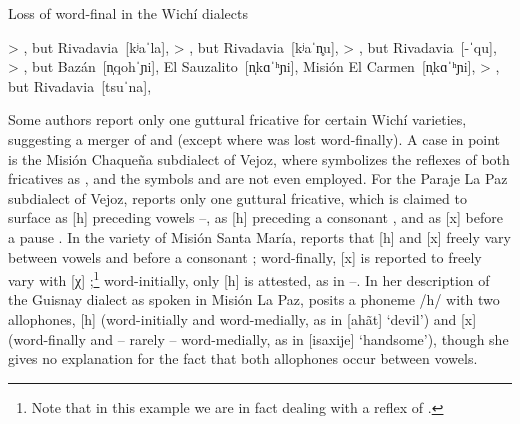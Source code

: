 \ea
Loss of word-final  in the Wichí dialects \citep{JT09-cap,JT09-th,MC09,VN14,KC16} \label{wi-h-0}\\
    \begin{xlist}
        \ex {} > , but Rivadavia~[kʲaˈla], 
        \ex {} > , but Rivadavia~[kʲaˈn̥u], 
        \ex {} > , but Rivadavia~[\mbox{-}ˈqu], 
        \ex {} > , but Bazán~[n̩qohˈɲi], El Sauzalito~[n̩kɑˈʰɲi], Misión El Carmen~[n̩kɑˈʰɲi], 
        \ex {} > , but Rivadavia~[tsuˈna], 
    \end{xlist}
\z
{}

Some authors report only one guttural fricative for certain Wichí varieties, suggesting a merger of  and  (except where  was lost word-finally). A case in point is the Misión Chaqueña subdialect of Vejoz, where \citet{VU74} symbolizes the reflexes of both fricatives as , and the symbols  and  are not even employed. For the Paraje La Paz subdialect of Vejoz, \citet{AFG067} reports only one guttural fricative, which is claimed to surface as [h] preceding vowels –, as [h] \recind [x] preceding a consonant , and as [x] \recind [χ] before a pause . In the variety of Misión Santa María, \citet{SS07} reports that [h] and [x] freely vary between vowels  and before a consonant ; word-finally, [x] is reported to freely vary with [χ] ;\footnote{Note that in this example we are in fact dealing with a reflex of .} word-initially, only [h] is attested, as in –. In her description of the Guisnay dialect as spoken in Misión La Paz, \citet{MA08} posits a phoneme /h/ with two allophones, [h] (word-initially and word-medially, as in [ahãt] `devil') and [x] (word-finally and -- rarely -- word-medially, as in [isaxije] `handsome'), though she gives no explanation for the fact that both allophones occur between vowels.

